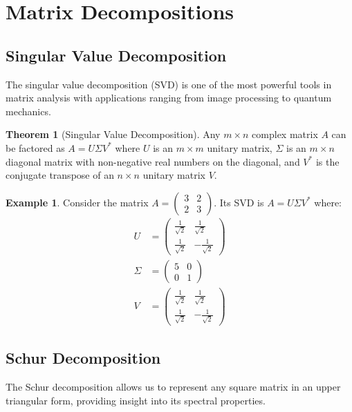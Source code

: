 \documentclass[12pt,a4paper]{article}
\theoremstyle{definition}
\newtheorem{theorem}{Theorem}[section]
\newtheorem{example}{Example}[section]
\begin{document}
\section{Matrix Decompositions}

\subsection{Singular Value Decomposition}
The singular value decomposition (SVD) is one of the most powerful tools in matrix analysis with applications ranging from image processing to quantum mechanics.

\begin{theorem}[Singular Value Decomposition]
Any $m \times n$ complex matrix $A$ can be factored as $A = U\Sigma V^*$ where $U$ is an $m \times m$ unitary matrix, $\Sigma$ is an $m \times n$ diagonal matrix with non-negative real numbers on the diagonal, and $V^*$ is the conjugate transpose of an $n \times n$ unitary matrix $V$.
\end{theorem}

\begin{example}
Consider the matrix $A = \begin{pmatrix} 3 & 2 \\ 2 & 3 \end{pmatrix}$. Its SVD is $A = U\Sigma V^*$ where:
\begin{align*}
U &= \begin{pmatrix} \frac{1}{\sqrt{2}} & \frac{1}{\sqrt{2}} \\ \frac{1}{\sqrt{2}} & -\frac{1}{\sqrt{2}} \end{pmatrix} \\
\Sigma &= \begin{pmatrix} 5 & 0 \\ 0 & 1 \end{pmatrix} \\
V &= \begin{pmatrix} \frac{1}{\sqrt{2}} & \frac{1}{\sqrt{2}} \\ \frac{1}{\sqrt{2}} & -\frac{1}{\sqrt{2}} \end{pmatrix}
\end{align*}
\end{example}

\subsection{Schur Decomposition}
The Schur decomposition allows us to represent any square matrix in an upper triangular form, providing insight into its spectral properties.
\end{document}
